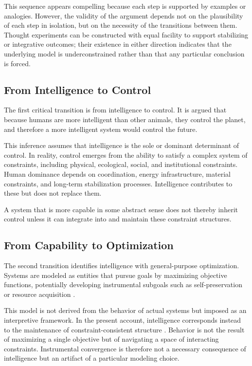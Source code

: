 \documentclass[11pt]{article}
\theoremstyle{plain}
\theoremstyle{definition}
\theoremstyle{remark}
\begin{document}
This sequence appears compelling because each step is supported by
examples or analogies. However, the validity of the argument depends not
on the plausibility of each step in isolation, but on the necessity of
the transitions between them. Thought experiments can be constructed with
equal facility to support stabilizing or integrative outcomes; their
existence in either direction indicates that the underlying model is
underconstrained rather than that any particular conclusion is forced.

\subsection{From Intelligence to Control}

The first critical transition is from intelligence to control. It is
argued that because humans are more intelligent than other animals, they
control the planet, and therefore a more intelligent system would control
the future.

This inference assumes that intelligence is the sole or dominant
determinant of control. In reality, control emerges from the ability
to satisfy a complex system of constraints, including physical,
ecological, social, and institutional constraints. Human dominance
depends on coordination, energy infrastructure, material constraints,
and long-term stabilization processes. Intelligence contributes to these
but does not replace them.

A system that is more capable in some abstract sense does not thereby
inherit control unless it can integrate into and maintain these constraint
structures.

\subsection{From Capability to Optimization}

The second transition identifies intelligence with general-purpose
optimization. Systems are modeled as entities that pursue goals by
maximizing objective functions, potentially developing instrumental
subgoals such as self-preservation or resource acquisition
\cite{russell2019human,amodei2016concrete}.

This model is not derived from the behavior of actual systems but
imposed as an interpretive framework. In the present account, intelligence
corresponds instead to the maintenance of constraint-consistent structure
\cite{friston2010free,clark2013whatever}. Behavior is not the result of
maximizing a single objective but of navigating a space of interacting
constraints. Instrumental convergence is therefore not a necessary
consequence of intelligence but an artifact of a particular modeling
choice.
\end{document}
